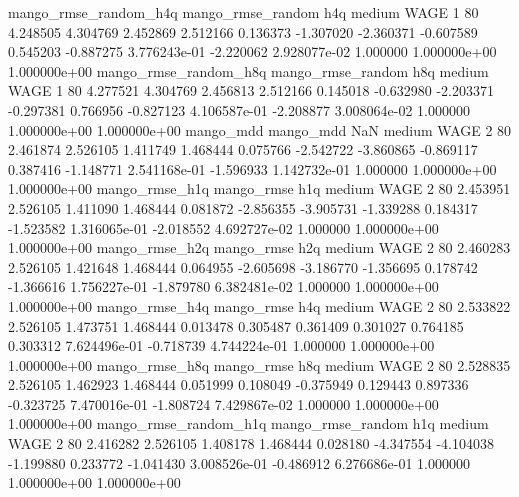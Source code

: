 mango_rmse_random_h4q mango_rmse_random                  h4q     medium     WAGE                 1 80  4.248505       4.304769 2.452869       2.512166    0.136373     -1.307020     -2.360371    -0.607589       0.545203 -0.887275 3.776243e-01    -2.220062   2.928077e-02            1.000000    1.000000e+00        1.000000e+00
mango_rmse_random_h8q mango_rmse_random                  h8q     medium     WAGE                 1 80  4.277521       4.304769 2.456813       2.512166    0.145018     -0.632980     -2.203371    -0.297381       0.766956 -0.827123 4.106587e-01    -2.208877   3.008064e-02            1.000000    1.000000e+00        1.000000e+00
            mango_mdd         mango_mdd                  NaN     medium     WAGE                 2 80  2.461874       2.526105 1.411749       1.468444    0.075766     -2.542722     -3.860865    -0.869117       0.387416 -1.148771 2.541168e-01    -1.596933   1.142732e-01            1.000000    1.000000e+00        1.000000e+00
       mango_rmse_h1q        mango_rmse                  h1q     medium     WAGE                 2 80  2.453951       2.526105 1.411090       1.468444    0.081872     -2.856355     -3.905731    -1.339288       0.184317 -1.523582 1.316065e-01    -2.018552   4.692727e-02            1.000000    1.000000e+00        1.000000e+00
       mango_rmse_h2q        mango_rmse                  h2q     medium     WAGE                 2 80  2.460283       2.526105 1.421648       1.468444    0.064955     -2.605698     -3.186770    -1.356695       0.178742 -1.366616 1.756227e-01    -1.879780   6.382481e-02            1.000000    1.000000e+00        1.000000e+00
       mango_rmse_h4q        mango_rmse                  h4q     medium     WAGE                 2 80  2.533822       2.526105 1.473751       1.468444    0.013478      0.305487      0.361409     0.301027       0.764185  0.303312 7.624496e-01    -0.718739   4.744224e-01            1.000000    1.000000e+00        1.000000e+00
       mango_rmse_h8q        mango_rmse                  h8q     medium     WAGE                 2 80  2.528835       2.526105 1.462923       1.468444    0.051999      0.108049     -0.375949     0.129443       0.897336 -0.323725 7.470016e-01    -1.808724   7.429867e-02            1.000000    1.000000e+00        1.000000e+00
mango_rmse_random_h1q mango_rmse_random                  h1q     medium     WAGE                 2 80  2.416282       2.526105 1.408178       1.468444    0.028180     -4.347554     -4.104038    -1.199880       0.233772 -1.041430 3.008526e-01    -0.486912   6.276686e-01            1.000000    1.000000e+00        1.000000e+00
